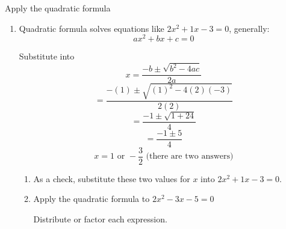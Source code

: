 \documentclass[12pt, twoside]{article}
\begin{document}
Apply the quadratic formula
\begin{enumerate}
  \subsubsection*{Factoring Fridays}

\item Quadratic formula solves equations like $2x^2+1x-3=0$, generally:
\[ax^2+bx+c=0\]

Substitute into
\[x=\frac{-b \pm \sqrt{b^2-4ac}}{2a}\] \vspace{0.5cm}
\[= \frac{-(1) \pm \sqrt{(1)^2-4(2)(-3)}}{2(2)}\] \vspace{0.5cm}
\[=\frac{-1 \pm \sqrt{1+24}}{4}\] \vspace{0.5cm}
\[=\frac{-1 \pm 5}{4}\] \vspace{0.5cm}
\[x=1 \text{ or } -\frac{3}{2} \text{ (there are two answers)}\] \vspace{0.5cm}

\begin{enumerate}
\item As a check, substitute these two values for $x$ into $2x^2+1x-3=0$.
\vspace{2.5cm}
\item Apply the quadratic formula to $2x^2-3x-5=0$

\newpage
Distribute or factor each expression.


\end{enumerate}
\end{enumerate}
\end{document}
